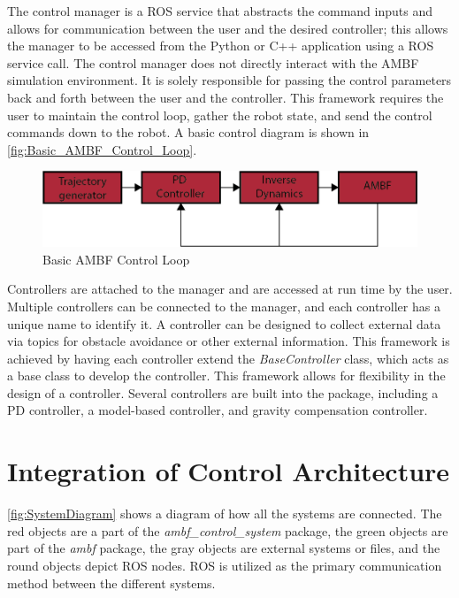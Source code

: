 The control manager is a ROS service that abstracts the command inputs and allows for communication between the user and the desired controller; this allows the manager to be accessed from the Python or C++ application using a ROS service call. The control manager does not directly interact with the AMBF simulation environment. It is solely responsible for passing the control parameters back and forth between the user and the controller. This framework requires the user to maintain the control loop, gather the robot state, and send the control commands down to the robot. A basic control diagram is shown in \autoref{fig:Basic_AMBF_Control_Loop}.


\begin{figure}[h!]
    \centering
    \includegraphics[scale=1.25]{images/sim/control_outline.png}
    \caption[Basic AMBF Control Loop]{Basic AMBF Control Loop}
    \label{fig:Basic_AMBF_Control_Loop}
\end{figure}

Controllers are attached to the manager and are accessed at run time by the user. Multiple controllers can be connected to the manager, and each controller has a unique name to identify it.  A controller can be designed to collect external data via topics for obstacle avoidance or other external information. This framework is achieved by having each controller extend the \textit{BaseController} class, which acts as a base class to develop the controller. This framework allows for flexibility in the design of a controller. Several controllers are built into the package, including a PD controller, a model-based controller, and gravity compensation controller.  



\section{Integration of Control Architecture}

\autoref{fig:SystemDiagram} shows a diagram of how all the systems are connected. The red objects are a part of the \textit{ambf\_control\_system} package, the green objects are part of the \textit{ambf} package, the gray objects are external systems or files, and the round objects depict ROS nodes. ROS is utilized as the primary communication method between the different systems.

